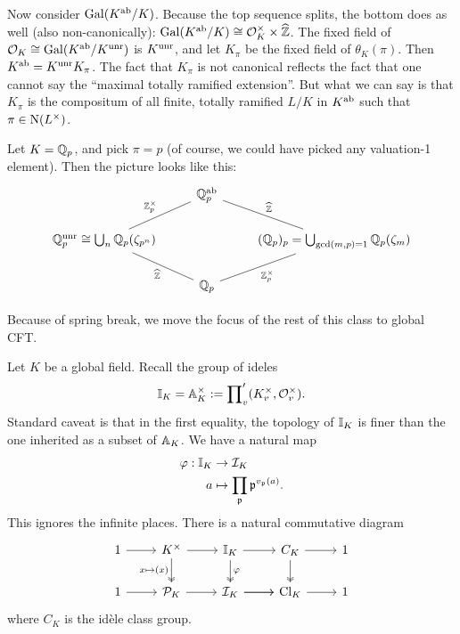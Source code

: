 \documentclass[11pt]{amsart}
\begin{document}
Now consider $\Gal(K^{\ab}/K)$. Because the top sequence splits, the bottom does as well (also non-canonically): $\Gal(K^{\ab}/K) \cong \cO_K^\times\times \wh{\ZZ}$. The fixed field of $\cO_K\cong \Gal(K^{\ab}/K^{\unr})$ is $K^{\unr}$, and let $K_\pi$ be the fixed field of $\theta_K(\pi)$. Then $K^{\ab} = K^{\unr}K_\pi$. The fact that $K_\pi$ is not canonical reflects the fact that one cannot say the ``maximal totally ramified extension''. But what we can say is that $K_\pi$ is the compositum of all finite, totally ramified $L/K$ in $K^{\ab}$ such that $\pi\in \N(L^\times)$.

\begin{exm}
    Let $K = \QQ_p$, and pick $\pi = p$ (of course, we could have picked any valuation-1 element). Then the picture looks like this:
    \[\begin{tikzcd}
	& {\QQ_p^{\ab}} \\
	{\QQ_p^{\unr} \cong \bigcup_n \QQ_p(\zeta_{p^n})} && {(\QQ_p)_p = \bigcup_{\gcd(m,p)=1} \QQ_p(\zeta_m)} \\
	& {\QQ_p}
	\arrow["{\wh{\ZZ}}", no head, from=3-2, to=2-1]
	\arrow["{\ZZ_p^\times}"', no head, from=3-2, to=2-3]
	\arrow["{\ZZ_p^\times}", no head, from=2-1, to=1-2]
	\arrow["{\wh{\ZZ}}"', no head, from=2-3, to=1-2]
\end{tikzcd}\]
\end{exm}

Because of spring break, we move the focus of the rest of this class to global CFT.

Let $K$ be a global field. Recall the group of ideles
\[\II_K = \AA_K^\times := \prod\nolimits_v ' (K_v^\times, \cO_v^\times).\]
Standard caveat is that in the first equality, the topology of $\II_K$ is finer than the one inherited as a subset of $\AA_K$. We have a natural map
\begin{align*}
    \varphi: \II_K &\to \cI_K \\
    a &\mapsto \prod_\fp \fp^{v_\fp(a)}.
\end{align*}
This ignores the infinite places. There is a natural commutative diagram
\[\begin{tikzcd}
	1 & {K^\times} & {\II_K} & {C_K} & 1 \\
	1 & {\cP_K} & {\cI_K} & {\Cl_K} & 1
	\arrow[from=2-3, to=2-4]
	\arrow[from=1-1, to=1-2]
	\arrow[from=1-2, to=1-3]
	\arrow[from=1-3, to=1-4]
	\arrow[from=1-4, to=1-5]
	\arrow[from=2-1, to=2-2]
	\arrow[from=2-2, to=2-3]
	\arrow[from=2-3, to=2-4]
	\arrow[from=2-4, to=2-5]
	\arrow["{x\mapsto (x)}"', two heads, from=1-2, to=2-2]
	\arrow["\varphi", two heads, from=1-3, to=2-3]
	\arrow[two heads, from=1-4, to=2-4]
\end{tikzcd}\]
where $C_K$ is the id\`ele class group.
\end{document}
